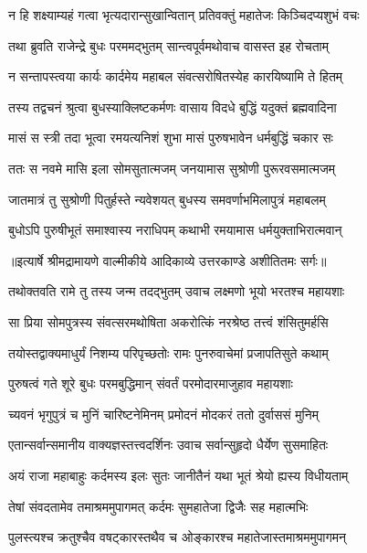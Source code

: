 \twolineshloka
{न हि शक्ष्याम्यहं गत्वा भृत्यदारान्सुखान्वितान्}
{प्रतिवक्तुं महातेजः किञ्चिदप्यशुभं वचः} %

\twolineshloka
{तथा ब्रुवति राजेन्द्रे बुधः परममद्भुतम्}
{सान्त्वपूर्वमथोवाच वासस्त इह रोचताम्} %

\twolineshloka
{न सन्तापस्त्वया कार्यः कार्दमेय महाबल}
{संवत्सरोषितस्येह कारयिष्यामि ते हितम्} %

\twolineshloka
{तस्य तद्वचनं श्रुत्वा बुधस्याक्लिष्टकर्मणः}
{वासाय विदधे बुद्धिं यदुक्तं ब्रह्मवादिना} %

\twolineshloka
{मासं स स्त्री तदा भूत्वा रमयत्यनिशं शुभा}
{मासं पुरुषभावेन धर्मबुद्धिं चकार सः} %

\twolineshloka
{ततः स नवमे मासि इला सोमसुतात्मजम्}
{जनयामास सुश्रोणी पुरूरवसमात्मजम्} %

\twolineshloka
{जातमात्रं तु सुश्रोणी पितुर्हस्ते न्यवेशयत्}
{बुधस्य समवर्णाभमिलापुत्रं महाबलम्} %

\twolineshloka
{बुधोऽपि पुरुषीभूतं समाश्वास्य नराधिपम्}
{कथाभी रमयामास धर्मयुक्ताभिरात्मवान्} %


{॥इत्यार्षे श्रीमद्रामायणे वाल्मीकीये आदिकाव्ये उत्तरकाण्डे अशीतितमः सर्गः॥}


\twolineshloka
{तथोक्तवति रामे तु तस्य जन्म तदद्भुतम्}
{उवाच लक्ष्मणो भूयो भरतश्च महायशाः} %

\twolineshloka
{सा प्रिया सोमपुत्रस्य संवत्सरमथोषिता}
{अकरोत्किं नरश्रेष्ठ तत्त्वं शंसितुमर्हसि} %

\twolineshloka
{तयोस्तद्वाक्यमाधुर्यं निशम्य परिपृच्छतोः}
{रामः पुनरुवाचेमां प्रजापतिसुते कथाम्} %

\twolineshloka
{पुरुषत्वं गते शूरे बुधः परमबुद्धिमान्}
{संवर्तं परमोदारमाजुहाव महायशाः} %

\twolineshloka
{च्यवनं भृगुपुत्रं च मुनिं चारिष्टनेमिनम्}
{प्रमोदनं मोदकरं ततो दुर्वाससं मुनिम्} %

\twolineshloka
{एतान्सर्वान्समानीय वाक्यज्ञस्तत्त्वदर्शिनः}
{उवाच सर्वान्सुहृदो धैर्येण सुसमाहितः} %

\twolineshloka
{अयं राजा महाबाहुः कर्दमस्य इलः सुतः}
{जानीतैनं यथा भूतं श्रेयो ह्यस्य विधीयताम्} %

\twolineshloka
{तेषां संवदतामेव तमाश्रममुपागमत्}
{कर्दमः सुमहातेजा द्विजैः सह महात्मभिः} %

\twolineshloka
{पुलस्त्यश्च क्रतुश्चैव वषट्कारस्तथैव च}
{ओङ्कारश्च महातेजास्तमाश्रममुपागमन्} %

